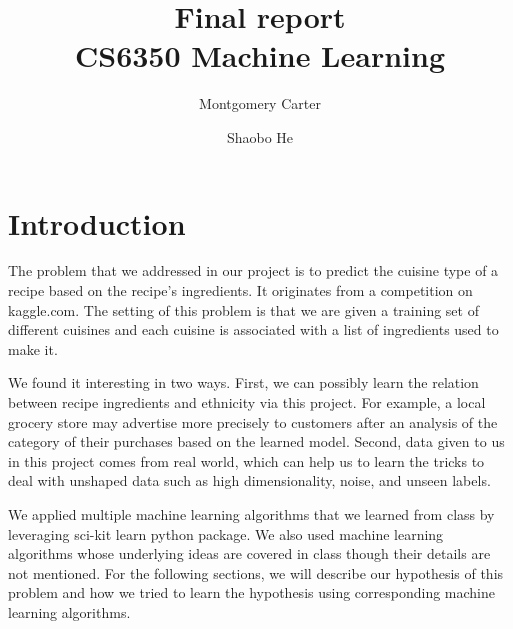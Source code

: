 \documentclass[11pt]{article}
\title{Final report\\CS6350 Machine Learning}
\author{Montgomery Carter \and Shaobo He}
\begin{document}
\maketitle

\section{Introduction}
The problem that we addressed in our project is to predict the cuisine type of a
recipe based on the recipe's ingredients. It originates from a competition on kaggle.com\cite{kaggle-link}. The setting of this problem is that we are given a training set of different cuisines and each cuisine is associated with a list of ingredients used to make it.

We found it interesting in two ways. First, we can possibly learn the relation between recipe ingredients and ethnicity via this project. For example, a local grocery store may advertise more precisely to customers after an analysis of the category of their purchases based on the learned model. Second, data given to us in this project comes from real world, which can help us to learn the tricks to deal with unshaped data such as high dimensionality, noise, and unseen labels.

We applied multiple machine learning algorithms that we learned from class by leveraging sci-kit learn python package. We also used machine learning algorithms whose underlying ideas are covered in class though their details are not mentioned. For the following sections, we will describe our hypothesis of this problem and how we tried to learn the hypothesis using corresponding machine learning algorithms.




\end{document}
